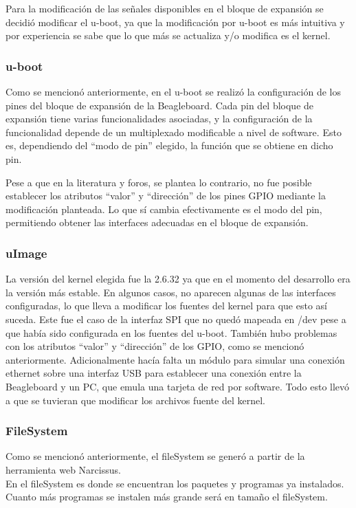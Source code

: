 \documentclass[%
        final,
        notitlepage,
        narroweqnarray,
        inline,
        ]{ieee}
\begin{document}
Para la modificación de las señales disponibles en el bloque de expansión se decidió modificar el u-boot, ya que la modificación por u-boot es más intuitiva y por experiencia se sabe que lo que más se actualiza y/o modifica es el kernel. 

\subsubsection{u-boot}
Como se mencionó anteriormente, en el u-boot se realizó la configuración de los pines del bloque de expansión de la Beagleboard. 
Cada pin del bloque de expansión tiene varias funcionalidades asociadas, y la configuración de la 
funcionalidad depende de un multiplexado modificable a nivel de software. Esto es, dependiendo del “modo de pin” elegido, la función que se obtiene en dicho pin.

Pese a que en la literatura y foros, se plantea lo contrario, no fue posible establecer los atributos “valor” y “dirección” de los pines GPIO mediante la modificación planteada. Lo que sí cambia efectivamente es el modo del pin, permitiendo obtener las interfaces adecuadas en el bloque de expansión.

\subsubsection{uImage}
La versión del kernel elegida fue la 2.6.32 ya que en el momento del desarrollo era la versión más estable.
En algunos casos, no aparecen algunas de las interfaces configuradas, lo que lleva a modificar los fuentes del kernel para que esto así suceda. Este fue el caso de la interfaz SPI que no quedó mapeada en /dev pese a que había sido configurada en los fuentes del u-boot. También hubo problemas con los atributos “valor” y “dirección” de los GPIO, como se mencionó anteriormente. Adicionalmente hacía falta un módulo para simular una conexión ethernet sobre una interfaz USB para establecer una conexión entre la Beagleboard y un PC, que emula una tarjeta de red por software.
Todo esto llevó a que se tuvieran que modificar los archivos fuente del kernel.

\subsubsection{FileSystem}

Como se mencionó anteriormente, el fileSystem se generó a partir de la herramienta web Narcissus.\\
En el fileSystem es donde se encuentran los paquetes y programas ya instalados. Cuanto más programas se instalen más grande será en tamaño el fileSystem.
\end{document}
